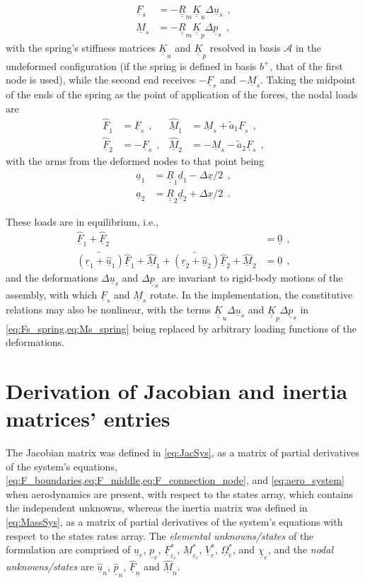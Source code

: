 \documentclass[12pt,a4paper,oneside,english]{abntex2} %
\newcommand{\fix}[1]{{\color{red}#1}}
\newcommand{\vect}[1]{\underline{#1}}
\def\tens#1{\underline{\underline{#1}}}
\def\til#1{\widetilde{#1}}
\def\lp{\left(}
\def\rp{\right)}
\def\A{\mathcal{A}}
\def\bp{b^+}
\def\R{\tens{R}}
\def\r{\vect{r}}
\def\u{\vect{u}}
\def\uhat{\widehat{\u}}
\def\V{\vect{V}}
\def\Vs{\V^{*}}
\def\Om{\vect{\Omega}}
\def\Oms{\Om^{*}}
\def\p{\vect{p}}
\def\phat{\widehat{\p}}
\def\F{\vect{F}}
\def\Fhat{\widehat{\F}}
\def\M{\vect{M}}
\def\Mhat{\widehat{\M}}
\def\zv{\vect{0}}
\def\ue{\u_e}
\def\pe{\p_e}
\def\Vse{\Vs_e}
\def\Omse{\Oms_e}
\def\Fsepse{\F^*_{\varepsilon_e}}
\def\Msepse{\M^*_{\varepsilon_e}}
\def\aerostates{\vect{\chi}_e}
\begin{document}
\begin{apendicesenv}
{\begin{align}
    \vect{F}_s &= -\R_m\tens{K}_u\Delta\u_s \ \ , \label{eq:Fs_spring}
    \\
    \vect{M}_s &= -\R_m\tens{K}_p\Delta\p_s \ \ , \label{eq:Ms_spring}
\end{align}
with the spring's stiffness matrices $\tens{K}_u$ and $\tens{K}_p$ resolved in basis $\A$ in the undeformed configuration (if the spring is defined in basis $\bp$, that of the first node is used), while the second end receives $-\vect{F}_s$ and $-\vect{M}_s$. Taking the midpoint of the ends of the spring as the point of application of the forces, the nodal loads are
\begin{equation}
\begin{aligned}
    \Fhat_1 &= \vect{F}_s \ \ , & \Mhat_1 &= \vect{M}_s + \til{a}_1\vect{F}_s \ \ ,
    \\
    \Fhat_2 &= -\vect{F}_s \ \ , & \Mhat_2 &= -\vect{M}_s - \til{a}_2\vect{F}_s \ \ ,
\end{aligned}
\label{eq:FMn_spring2}
\end{equation}
with the arms from the deformed nodes to that point being
\begin{align}
    \vect{a}_1 &= \R_1\vect{d}_1-\Delta\vect{x}/2 \ \ ,
    \\
    \vect{a}_2 &= \R_2\vect{d}_2+\Delta\vect{x}/2 \ \ .
\end{align}

These loads are in equilibrium, i.e.,
\begin{align}
    \Fhat_1+\Fhat_2 &= \zv \ \ ,
    \\
    \til{\lp\r_1+\uhat_1\rp}\Fhat_1+\Mhat_1+\til{\lp\r_2+\uhat_2\rp}\Fhat_2+\Mhat_2 &= \zv \ \ ,
\end{align}
and the deformations $\Delta\u_s$ and $\Delta\p_s$ are invariant to rigid-body motions of the assembly, with which $\vect{F}_s$ and $\vect{M}_s$ rotate. In the implementation, the constitutive relations may also be nonlinear, with the terms $\tens{K}_u\Delta\u_s$ and $\tens{K}_p\Delta\p_s$ in \cref{eq:Fs_spring,eq:Ms_spring} being replaced by arbitrary loading functions of the deformations.}

\section{Derivation of Jacobian and inertia matrices' entries}
\label{sec:JM}

The Jacobian matrix was defined in \cref{eq:JacSys}, as a matrix of partial derivatives of the system's equations, \cref{eq:F_boundaries,eq:F_middle,eq:F_connection_node}, and \cref{eq:aero_system} when aerodynamics are present, with respect to the states array, which contains the independent unknowns, whereas the inertia matrix was defined in \cref{eq:MassSys}, as a matrix of partial derivatives of the system's equations with respect to the states rates array. The \textit{elemental unknowns/states} of the formulation are comprised of $\ue$, $\pe$, \fix{$\Fsepse$, $\Msepse$}, $\Vse$, $\Omse$, and $\aerostates$, and the \textit{nodal unknowns/states} are $\uhat_n$, $\phat_n$, $\Fhat_n$ and $\Mhat_n$. 


\end{apendicesenv}
\end{document}
